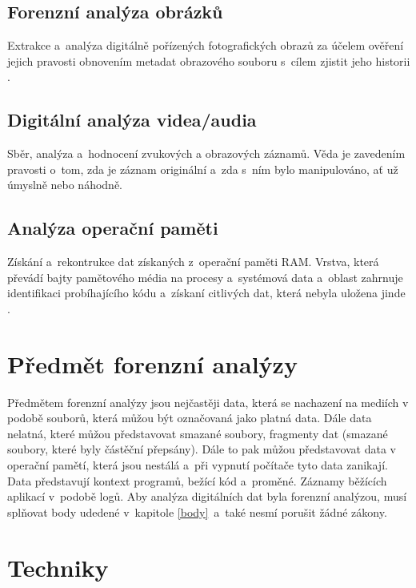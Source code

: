 \documentclass[thesis=B,czech]{FITthesis}[2012/06/26]
\begin{document}
\subsection{Forenzní analýza obrázků}
Extrakce a~analýza digitálně pořízených fotografických obrazů za účelem ověření jejich pravosti obnovením metadat obrazového souboru s~cílem zjistit jeho historii \cite{for_types}.

\subsection{Digitální analýza videa/audia}
Sběr, analýza a~hodnocení zvukových a obrazových záznamů. Věda je zavedením pravosti o~tom, zda je záznam originální a~zda s~ním bylo manipulováno, ať už úmyslně nebo náhodně.

\subsection{Analýza operační paměti}
Získání a~rekontrukce dat získaných z~operační paměti RAM. Vrstva, která převádí bajty pamětového média na procesy a~systémová data a~oblast zahrnuje identifikaci probíhajícího kódu a~získaní citlivých dat, která nebyla uložena jinde \cite{carrier2003defining}. 




\section{Předmět forenzní analýzy}

Předmětem forenzní analýzy jsou nejčastěji data, která se nachazení na mediích v podobě souborů, která můžou být označovaná jako platná data. Dále data nelatná, které můžou představovat smazané soubory, fragmenty dat (smazané soubory, které byly částěční přepsány). Dále to pak můžou představovat data v operační pamětí, která jsou nestálá a~při vypnutí počítače tyto data zanikají. Data představují kontext programů, bežící kód a~proměné. Záznamy běžících aplikací v~podobě logů. 
Aby analýza digitálních dat byla forenzní analýzou, musí splňovat body udedené v~kapitole \ref{body}~a~také nesmí porušit žádné zákony.



\section{Techniky}
\end{document}
